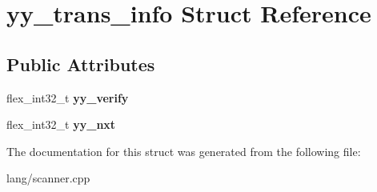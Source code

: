 \hypertarget{structyy__trans__info}{}\section{yy\+\_\+trans\+\_\+info Struct Reference}
\label{structyy__trans__info}
\subsection*{Public Attributes}
\begin{DoxyCompactItemize}
\item 
\mbox{\label{structyy__trans__info_a5c9f61e770deef50bd4e697310342fe9}} 
flex\+\_\+int32\+\_\+t {\bfseries yy\+\_\+verify}
\item 
\mbox{\label{structyy__trans__info_ae0715250c2bef261e596e77e0030f13e}} 
flex\+\_\+int32\+\_\+t {\bfseries yy\+\_\+nxt}
\end{DoxyCompactItemize}


The documentation for this struct was generated from the following file\+:\begin{DoxyCompactItemize}
\item 
lang/scanner.\+cpp\end{DoxyCompactItemize}
